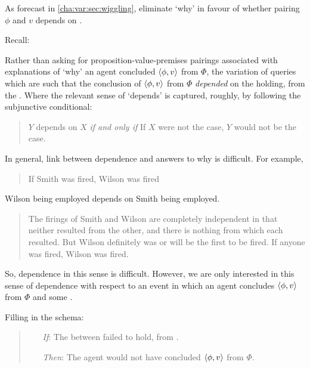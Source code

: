 \begin{note}
  As forecast in \autoref{cha:var:sec:wiggling}, eliminate `why' in favour of whether pairing \(\phi\) and \(v\) depends on \ros{}.

  Recall:
  \begin{quote}%
    \vspace{-1.5\baselineskip}%
    \questionWhyBasic*
  \end{quote}

  Rather than asking for proposition-value-premises pairings associated with explanations of `why' an agent concluded \(\langle \phi, v \rangle\) from \(\Phi\), the variation of \qWhy{} queries which  are such that the conclusion of \(\langle \phi, v \rangle\) from \(\Phi\) \emph{depended} on the  holding, from the \agpe{}.
  Where the relevant sense of `depends' is captured, roughly, by following the subjunctive conditional:

  \begin{quote}
    \(Y\) depends on \(X\) \emph{if and only if} If \(X\) were not the case, \(Y\) would not be the case.
  \end{quote}

  In general, link between dependence and answers to why is difficult.
  For example,

  \begin{quote}
    If Smith was fired, Wilson was fired
  \end{quote}
  Wilson being employed depends on Smith being employed.

  \begin{quote}
    The firings of Smith and Wilson are completely independent in that neither resulted from the other, and there is nothing from which each resulted. But Wilson definitely was or will be the first to be fired. If anyone was fired, Wilson was fired.
  \end{quote}

  So, dependence in this sense is difficult.
  However, we are only interested in this sense of dependence with respect to an event in which an agent concludes \(\langle \phi, v \rangle\) from \(\Phi\) and some \ros{}.

  Filling in the schema:

  \begin{quote}
    \begin{enumerate}
    \item[\emph{If}:]
      The  between failed to hold, from \agpe{}.
    \item[\emph{Then}:]
      The agent would not have concluded \(\langle \phi, v \rangle\) from \(\Phi\).
    \end{enumerate}
  \end{quote}



\end{note}

